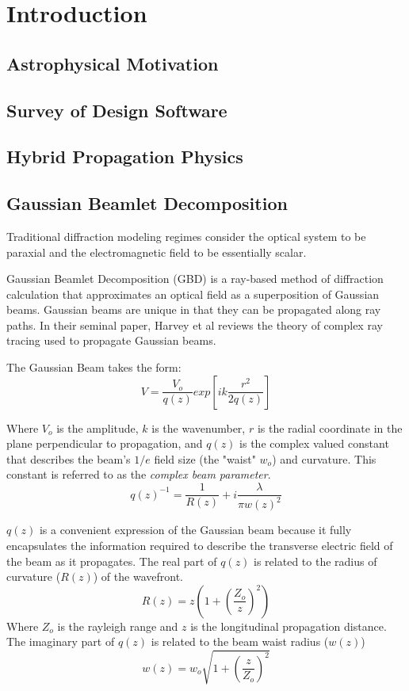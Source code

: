 \section{Introduction}
\label{sect:intro}  %
\subsection{Astrophysical Motivation}
\subsection{Survey of Design Software}
\subsection{Hybrid Propagation Physics}
\subsection{Gaussian Beamlet Decomposition}

Traditional diffraction modeling regimes consider the optical system to be paraxial and the electromagnetic field to be essentially scalar. 

Gaussian Beamlet Decomposition (GBD) is a ray-based method of diffraction calculation that approximates an optical field as a superposition of Gaussian beams. Gaussian beams are unique in that they can be propagated along ray paths. In their seminal paper, Harvey et al\cite{Harvey15} reviews the theory of complex ray tracing used to propagate Gaussian beams. 

The Gaussian Beam takes the form: \cite{goodman17}
\begin{equation}
	V = \frac{V_o}{q(z)}exp[ik\frac{r^2}{2q(z)}]
\end{equation}

Where $V_o$ is the amplitude, $k$ is the wavenumber, $r$ is the radial coordinate in the plane perpendicular to propagation, and $q(z)$ is the complex valued constant that describes the beam's $1/e$ field size (the "waist" $w_o$) and curvature. This constant is referred to as the \textit{complex beam parameter}.
\begin{equation}
	q(z)^{-1} = \frac{1}{R(z)}+i\frac{\lambda}{\pi w(z)^2}
\end{equation}	

$q(z)$ is a convenient expression of the Gaussian beam because it fully encapsulates the information required to describe the transverse electric field of the beam as it propagates. The real part of $q(z)$ is related to the radius of curvature ($R(z)$) of the wavefront.
\begin{equation}
	R(z) = z(1+(\frac{Z_o}{z})^2)
\end{equation}
Where $Z_o$ is the rayleigh range and $z$ is the longitudinal propagation distance.
The imaginary part of $q(z)$ is related to the beam waist radius ($w(z)$)
\begin{equation}
	w(z) = w_o\sqrt{1+(\frac{z}{Z_o})^2}
\end{equation}

